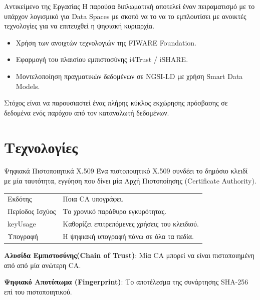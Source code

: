 \documentclass[11pt]{beamer}
\newcommand{\en}[1]{\foreignlanguage{english}{#1}}
\begin{document}
\begin{frame}{Αντικείμενο της Εργασίας}
Η παρούσα διπλωματική αποτελεί έναν πειραματισμό με το υπάρχον λογισμικό για \textlatin{Data Spaces}
με σκοπό να το να το εμπλουτίσει με ανοικτές τεχνολογίες για να επιτευχθεί η ψηφιακή κυριαρχία.
\bigskip

\begin{itemize}
    \item Χρήση των ανοιχτών τεχνολογιών της \en{FIWARE Foundation}.
    \item Εφαρμογή του πλαισίου εμπιστοσύνης \en{i4Trust / iSHARE}.
    \item Μοντελοποίηση πραγματικών δεδομένων σε \en{NGSI-LD} με χρήση
    \en{Smart Data Models}.
\end{itemize}
Στόχος είναι να παρουσιαστεί ένας πλήρης κύκλος εκχώρησης πρόσβασης σε δεδομένα ενός παρόχου
από τον καταναλωτή δεδομένων.
\end{frame}

\section{Τεχνολογίες}

\begin{frame}{Ψηφιακά Πιστοποιητικά \en{X.509}}
Ένα πιστοποιητικό \textlatin{X.509} συνδέει το δημόσιο κλειδί με μία ταυτότητα,
εγγύηση που δίνει μία Αρχή Πιστοποίησης (\en{Certificate Authority}).

\begin{table}
    \centering
    \small
    \begin{tabular}{@{} l p{7.5cm} @{}}
        \toprule
        Εκδότης & Ποια \textlatin{CA} υπογράφει.\\
        \addlinespace
        Περίοδος Ισχύος & Το χρονικό παράθυρο εγκυρότητας. \\
        \addlinespace
        \textlatin{keyUsage} & Καθορίζει επιτρεπόμενες χρήσεις του κλειδιού. \\
        \addlinespace
        Υπογραφή & Η ψηφιακή υπογραφή πάνω σε όλα τα πεδία. \\
        \bottomrule
    \end{tabular}
\end{table}
\bigskip

\textbf{Αλυσίδα Εμπιστοσύνης(\textlatin{Chain of Trust})}:
Μία \textlatin{CA} μπορεί να είναι πιστοποιημένη από από μία ανώτερη \textlatin{CA}.
  
\textbf{Ψηφιακό Αποτύπωμα (\textlatin{Fingerprint})}:
Το αποτέλεσμα της συνάρτησης \textlatin{SHA-256} επί του πιστοποιητικού.
\end{frame}
\end{document}
